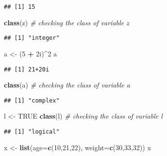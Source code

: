 \documentclass[
]{article}
\newenvironment{Shaded}{\begin{snugshade}}{\end{snugshade}}
\newcommand{\AttributeTok}[1]{\textcolor[rgb]{0.13,0.29,0.53}{#1}}
\newcommand{\CommentTok}[1]{\textcolor[rgb]{0.56,0.35,0.01}{\textit{#1}}}
\newcommand{\ConstantTok}[1]{\textcolor[rgb]{0.56,0.35,0.01}{#1}}
\newcommand{\DataTypeTok}[1]{\textcolor[rgb]{0.13,0.29,0.53}{#1}}
\newcommand{\DecValTok}[1]{\textcolor[rgb]{0.00,0.00,0.81}{#1}}
\newcommand{\FunctionTok}[1]{\textcolor[rgb]{0.13,0.29,0.53}{\textbf{#1}}}
\newcommand{\NormalTok}[1]{#1}
\newcommand{\OtherTok}[1]{\textcolor[rgb]{0.56,0.35,0.01}{#1}}
\newcommand{\SpecialCharTok}[1]{\textcolor[rgb]{0.81,0.36,0.00}{\textbf{#1}}}
\begin{document}
\begin{verbatim}
## [1] 15
\end{verbatim}

\begin{Shaded}
\begin{Highlighting}[]
\FunctionTok{class}\NormalTok{(z) }\CommentTok{\# checking the class of variable z}
\end{Highlighting}
\end{Shaded}

\begin{verbatim}
## [1] "integer"
\end{verbatim}

\begin{Shaded}
\begin{Highlighting}[]
\NormalTok{a }\OtherTok{\textless{}{-}}\NormalTok{ (}\DecValTok{5} \SpecialCharTok{+} \DecValTok{2}\DataTypeTok{i}\NormalTok{)}\SpecialCharTok{\^{}}\DecValTok{2}
\NormalTok{a}
\end{Highlighting}
\end{Shaded}

\begin{verbatim}
## [1] 21+20i
\end{verbatim}

\begin{Shaded}
\begin{Highlighting}[]
\FunctionTok{class}\NormalTok{(a) }\CommentTok{\# checking the class of variable a}
\end{Highlighting}
\end{Shaded}

\begin{verbatim}
## [1] "complex"
\end{verbatim}

\begin{Shaded}
\begin{Highlighting}[]
\NormalTok{l }\OtherTok{\textless{}{-}} \ConstantTok{TRUE}
\FunctionTok{class}\NormalTok{(l) }\CommentTok{\# checking the class of variable l}
\end{Highlighting}
\end{Shaded}

\begin{verbatim}
## [1] "logical"
\end{verbatim}

\begin{Shaded}
\begin{Highlighting}[]
\NormalTok{x }\OtherTok{\textless{}{-}} \FunctionTok{list}\NormalTok{(}\AttributeTok{age=}\FunctionTok{c}\NormalTok{(}\DecValTok{10}\NormalTok{,}\DecValTok{21}\NormalTok{,}\DecValTok{22}\NormalTok{), }\AttributeTok{weight=}\FunctionTok{c}\NormalTok{(}\DecValTok{30}\NormalTok{,}\DecValTok{33}\NormalTok{,}\DecValTok{32}\NormalTok{))}
\NormalTok{x}
\end{Highlighting}
\end{Shaded}
\end{document}
